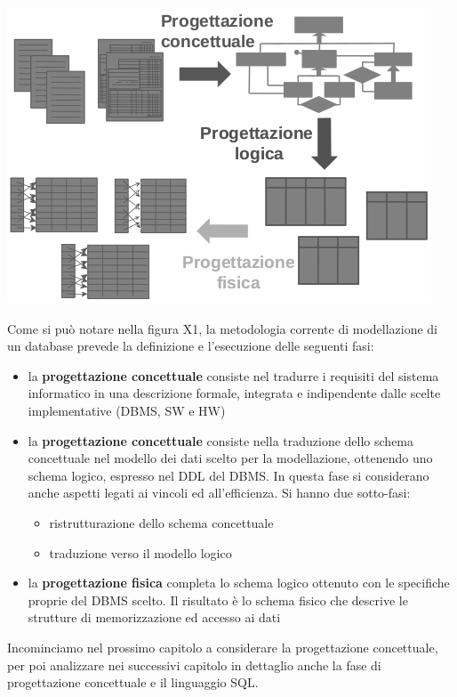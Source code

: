 \documentclass[a4paper,12pt, oneside]{book}
\begin{document}
\begin{center}
	\includegraphics[scale=2.5]{img/bas4.png}
\end{center}
Come si può notare nella figura X1, la metodologia corrente di modellazione di un database
prevede la definizione e l'esecuzione delle seguenti fasi:
\begin{itemize}
	\item la \textbf{progettazione concettuale} consiste nel tradurre i requisiti del sistema informatico
	      in una descrizione formale, integrata e indipendente dalle scelte implementative (DBMS, SW e HW)
	\item la \textbf{progettazione concettuale} consiste nella traduzione dello schema concettuale nel modello dei dati
	      scelto per la modellazione, ottenendo uno schema logico, espresso nel DDL del DBMS.\newline
	      In questa fase si considerano anche aspetti legati ai vincoli ed all'efficienza. Si hanno due sotto-fasi:
	      \begin{itemize}
		      \item ristrutturazione dello schema concettuale
		      \item traduzione verso il modello logico
	      \end{itemize}
	\item la \textbf{progettazione fisica} completa lo schema logico ottenuto con le specifiche proprie del DBMS scelto.
	      Il risultato è lo schema fisico che descrive le strutture di memorizzazione ed accesso ai dati
\end{itemize}
Incominciamo nel prossimo capitolo a considerare la progettazione concettuale, per poi analizzare nei successivi capitolo
in dettaglio anche la fase di progettazione concettuale e il linguaggio SQL.
\end{document}
